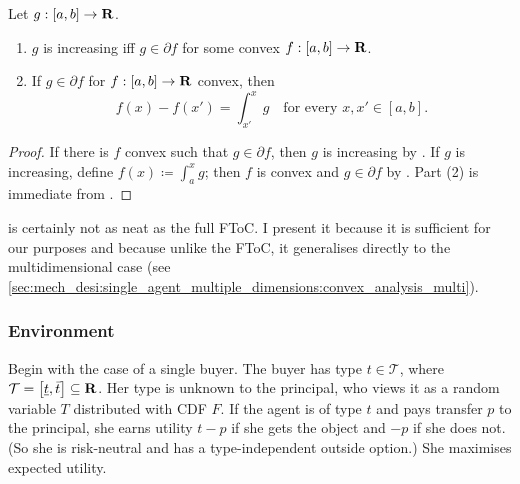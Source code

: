 \documentclass[11pt,letterpaper,reqno,oneside]{article}
\begin{document}
\begin{corollary}
	\label{corollary:convex_FTC_1d}
	Let $g : [a,b] \to \mathbf{R}$.
	\begin{enumerate}

		\item $g$ is increasing iff $g \in \partial f$ for some convex $f : [a,b] \to \mathbf{R}$.

		\item If $g \in \partial f$ for $f : [a,b] \to \mathbf{R}$ convex, then
		\begin{equation*}
			f(x) - f(x') = \int_{x'}^x g
			\quad\text{for every $x,x' \in [a,b]$} .
		\end{equation*}		

	\end{enumerate}
\end{corollary}

\begin{proof}
	If there is $f$ convex such that $g \in \partial f$, then $g$ is increasing by . If $g$ is increasing, define $f(x) \coloneqq \int_a^x g$; then $f$ is convex and $g \in \partial f$ by . Part (2) is immediate from .
\end{proof}

 is certainly not as neat as the full FToC. I present it because it is sufficient for our purposes and because unlike the FToC, it generalises directly to the multidimensional case (see \cref{sec:mech_desi:single_agent_multiple_dimensions:convex_analysis_multi}).



\subsubsection{Environment}
\label{sec:mech_desi:single_agent_one_dimension:environment}

Begin with the case of a single buyer. The buyer has type $t \in \mathcal{T}$, where $\mathcal{T} = \left[ \underline{t}, \bar{t} \right] \subseteq \mathbf{R}$. Her type is unknown to the principal, who views it as a random variable $T$ distributed with CDF $F$. If the agent is of type $t$ and pays transfer $p$ to the principal, she earns utility $t-p$ if she gets the object and $-p$ if she does not. (So she is risk-neutral and has a type-independent outside option.) She maximises expected utility.
\end{document}

